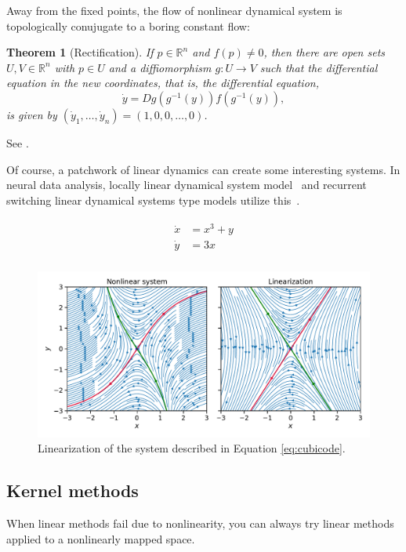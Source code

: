 \documentclass[a4paper,11pt]{exam}
\newtheorem{theorem}{Theorem}
\newcounter{ct}
\newcommand{\inv}{^{-1}}
\newcommand{\field}[1]{\ensuremath{\mathbb{#1}}}
\newcommand{\reals}{\field{R}}
\begin{document}
\begin{questions}
Away from the fixed points, the flow of nonlinear dynamical system is topologically conujugate to a boring constant flow:
\begin{theorem}[Rectification]
    If $p \in \reals^n$ and $f(p) \neq 0$, then there are open sets $U, V \in \reals^n$ with $p \in U$ and a diffiomorphism $g: U \to V$ such that the differential equation in the new coordinates, that is, the differential equation,
    $$ \dot{y} = Dg(g\inv(y)) f(g\inv(y)), $$
is given by $(\dot{y}_1, \ldots, \dot{y}_n) = (1, 0, 0, \ldots, 0)$.
\end{theorem}
See \citet[Lemma 1.120]{Chicone2006}.

Of course, a patchwork of linear dynamics can create some interesting systems.
In neural data analysis, locally linear dynamical system model~\cite{Zhao2016d} and recurrent switching linear dynamical systems type models utilize this~\citep{Linderman2017,Nassar2018b}.

\begin{align}\label{eq:cubicode}
\begin{split}
\dot x &= x^3 + y\\
\dot y &= 3x \\
\end{split}
\end{align}

\begin{figure}[h]
    \centering
    \includegraphics[width=\textwidth]{linearization}
    \caption{Linearization of the system described in Equation \ref{eq:cubicode}.}
    \label{fig:linearization}
\end{figure}

\subsection{Kernel methods}
When linear methods fail due to nonlinearity, you can always try linear methods applied to a nonlinearly mapped space.


\end{questions}
\end{document}
